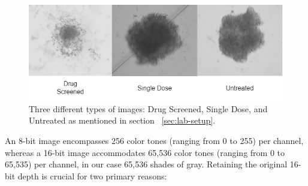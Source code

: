 \begin{figure}[H]
  \centering
  \includegraphics[scale=0.6]{figures/originals.png} 
  \caption{Three different types of images: Drug Screened, Single Dose, and Untreated as mentioned in section ~\ref{sec:lab-setup}.}
  \label{fig:originals}
\end{figure}

An 8-bit image encompasses 256 color tones (ranging from 0 to 255) per channel, whereas a 16-bit image accommodates 65,536 color tones (ranging from 0 to 65,535) per channel, in our case 65,536 shades of gray. Retaining the original 16-bit depth is crucial for two primary reasons:

